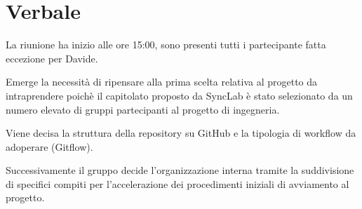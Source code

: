 \documentclass[italian,12pt]{article} %
\begin{document}
\newpage

\section{Verbale}
\begin{flushleft}

	La riunione ha inizio alle ore 15:00, sono presenti tutti i partecipante fatta eccezione per Davide.

	Emerge la necessità di ripensare alla prima scelta relativa al progetto da intraprendere poichè il capitolato proposto 
	da SyncLab è stato selezionato da un numero elevato di gruppi partecipanti al progetto di ingegneria. 
	
	Viene decisa la struttura della repository su GitHub e la tipologia di workflow da adoperare (Gitflow).
	
	Successivamente il gruppo decide l’organizzazione interna tramite la suddivisione di specifici compiti 
	per l’accelerazione dei procedimenti iniziali di avviamento al progetto.

\end{flushleft}
\end{document}
